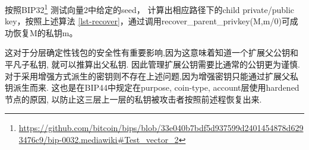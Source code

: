 按照BIP32\footnote{
\url{https://github.com/bitcoin/bips/blob/33e040b7bdf5d937599d2401454878d6293476c9/bip-0032.mediawiki\#Test_vector_2}}
测试向量2中给定的seed，
计算出相应路径下的child private/public key，按照上述算法
\ref{lst-recover}，通过调用\textsf{recover_parent_privkey(M,m/0)}可成功恢复M的私钥m。

这对于分层确定性钱包的安全性有重要影响,因为这意味着知道一个扩展父公钥和平凡子私钥,
就可以推算出父私钥. 因此管理扩展公钥需要比通常的公钥更为谨慎.
对于采用增强方式派生的密钥则不存在上述问题,因为增强密钥只能通过扩展父私钥派生而来.
这也是在BIP44中规定在purpose, coin-type, account层使用hardened 节点的原因,
以防止这三层上一层的私钥被攻击者按照前述程恢复出来.



